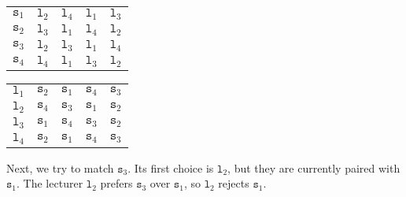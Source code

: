 \documentclass[a4paper, openany]{memoir}
\begin{document}
    \begin{table}[H]
        \centering
        \begin{subtable}{0.45\textwidth}
            \centering
            \begin{tabular}{c|cccc}
                $\texttt{s}_1$ & \underline{$\texttt{l}_2$} & $\texttt{l}_4$ & $\texttt{l}_1$ & $\texttt{l}_3$ \\
                $\texttt{s}_2$ & \underline{$\texttt{l}_3$} & $\texttt{l}_1$ & $\texttt{l}_4$ & $\texttt{l}_2$ \\
                $\texttt{s}_3$ & \underline{$\texttt{l}_2$} & $\texttt{l}_3$ & $\texttt{l}_1$ & $\texttt{l}_4$ \\
                $\texttt{s}_4$ & $\texttt{l}_4$ & $\texttt{l}_1$ & $\texttt{l}_3$ & $\texttt{l}_2$
            \end{tabular}
        \end{subtable}
        \hfill
        \begin{subtable}{0.45\textwidth}
            \centering
            \begin{tabular}{c|cccc}
                $\texttt{l}_1$ & $\texttt{s}_2$ & $\texttt{s}_1$ & $\texttt{s}_4$ & $\texttt{s}_3$ \\
                $\texttt{l}_2$ & $\texttt{s}_4$ & \underline{$\texttt{s}_3$} & \underline{$\texttt{s}_1$} & $\texttt{s}_2$ \\
                $\texttt{l}_3$ & $\texttt{s}_1$ & $\texttt{s}_4$ & $\texttt{s}_3$ & \underline{$\texttt{s}_2$} \\
                $\texttt{l}_4$ & $\texttt{s}_2$ & $\texttt{s}_1$ & $\texttt{s}_4$ & $\texttt{s}_3$
            \end{tabular}
        \end{subtable}
    \end{table}
    \noindent Next, we try to match $\texttt{s}_3$. Its first choice is $\texttt{l}_2$, but they are currently paired with $\texttt{s}_1$. The lecturer $\texttt{l}_2$ prefers $\texttt{s}_3$ over $\texttt{s}_1$, so $\texttt{l}_2$ rejects $\texttt{s}_1$. 
\end{document}
